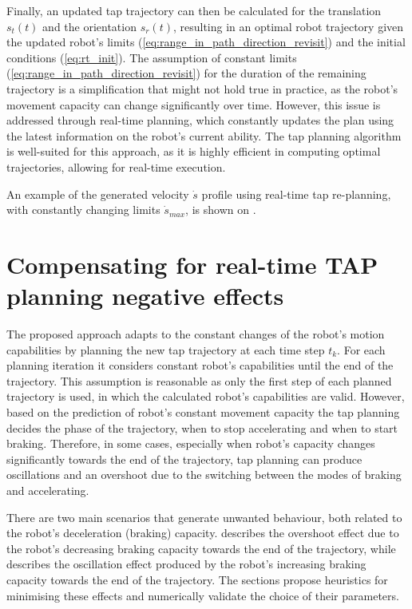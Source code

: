 Finally, an updated \gls{tap} trajectory can then be calculated for the translation $s_t(t)$ and the orientation $s_r(t)$, resulting in an optimal robot trajectory given the updated robot's limits (\ref{eq:range_in_path_direction_revisit}) and the initial conditions (\ref{eq:rt_init}). 
The assumption of constant limits (\ref{eq:range_in_path_direction_revisit}) for the duration of the remaining trajectory is a simplification that might not hold true in practice, as the robot's movement capacity can change significantly over time. However, this issue is addressed through real-time planning, which constantly updates the plan using the latest information on the robot's current ability. The \gls{tap} planning algorithm is well-suited for this approach, as it is highly efficient in computing optimal trajectories, allowing for real-time execution. 

An example of the generated velocity $\dot{s}$ profile using real-time \gls{tap} re-planning, with constantly changing limits $\dot{s}_{max}$, is shown on . 

\section{Compensating for real-time TAP planning negative effects}
\label{ch:heuristics}
The proposed approach adapts to the constant changes of the robot's motion capabilities by planning the new \gls{tap} trajectory at each time step $t_k$. For each planning iteration it considers constant robot's capabilities until the end of the trajectory. This assumption is reasonable as only the first step of each planned trajectory is used, in which the calculated robot's capabilities are valid. 
However, based on the prediction of robot's constant movement capacity the \gls{tap} planning decides the phase of the trajectory, when to stop accelerating and when to start braking. Therefore, in some cases, especially when robot's capacity changes significantly towards the end of the trajectory, \gls{tap} planning can produce oscillations and an overshoot due to the switching between the modes of braking and accelerating.
 
There are two main scenarios that generate unwanted behaviour, both related to the robot's deceleration (braking) capacity. 
 describes the overshoot effect due to the robot's decreasing braking capacity towards the end of the trajectory, while  describes the oscillation effect produced by the robot's increasing braking capacity towards the end of the trajectory. The sections propose heuristics for minimising these effects and numerically validate the choice of their parameters.

